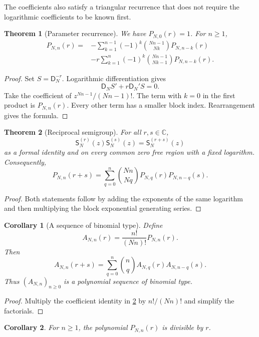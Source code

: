 \documentclass{aomart}
\newtheorem{theorem}{Theorem}[section]
\newtheorem{corollary}[corollary]{Corollary}
\theoremstyle{definition}
\theoremstyle{remark}
\newcommand{\CC}{\mathbb C}
\newcommand{\Dfun}{\mathsf D}
\newcommand{\Sfun}{\mathsf S}
\begin{document}
The coefficients also satisfy a triangular recurrence that does not require the logarithmic coefficients to be known first.

\begin{theorem}[Parameter recurrence]\label{thm:parameter_recurrence}
We have $P_{N,0}(r)=1$.  For $n\geq1$,
\[
\begin{aligned}
P_{N,n}(r)
={}&-
\sum_{k=1}^{n-1}
(-1)^k
\binom{Nn-1}{Nk}
P_{N,n-k}(r)
\\
&-r
\sum_{k=1}^{n}
(-1)^k
\binom{Nn-1}{Nk-1}
P_{N,n-k}(r).
\end{aligned}
\]
\end{theorem}

\begin{proof}
Set $S=\Dfun_N^{-r}$.  Logarithmic differentiation gives
\[
\Dfun_NS'+r\Dfun_N'S=0.
\]
Take the coefficient of $z^{Nn-1}/(Nn-1)!$.  The term with $k=0$ in the first product is $P_{N,n}(r)$.  Every other term has a smaller block index.  Rearrangement gives the formula.
\end{proof}

\begin{theorem}[Reciprocal semigroup]\label{thm:reciprocal_semigroup}
For all $r,s\in\CC$,
\[
\Sfun_N^{(r)}(z)\Sfun_N^{(s)}(z)
=
\Sfun_N^{(r+s)}(z)
\]
as a formal identity and on every common zero free region with a fixed logarithm.  Consequently,
\[
P_{N,n}(r+s)
=
\sum_{q=0}^{n}
\binom{Nn}{Nq}
P_{N,q}(r)P_{N,n-q}(s).
\]
\end{theorem}

\begin{proof}
Both statements follow by adding the exponents of the same logarithm and then multiplying the block exponential generating series.
\end{proof}

\begin{corollary}[A sequence of binomial type]\label{cor:binomial_type}
Define
\[
A_{N,n}(r)
=
\frac{n!}{(Nn)!}P_{N,n}(r).
\]
Then
\[
A_{N,n}(r+s)
=
\sum_{q=0}^{n}
\binom nq
A_{N,q}(r)A_{N,n-q}(s).
\]
Thus $(A_{N,n})_{n\geq0}$ is a polynomial sequence of binomial type.
\end{corollary}

\begin{proof}
Multiply the coefficient identity in \cref{thm:reciprocal_semigroup} by $n!/(Nn)!$ and simplify the factorials.
\end{proof}

\begin{corollary}\label{cor:factor_r}
For $n\geq1$, the polynomial $P_{N,n}(r)$ is divisible by $r$.
\end{corollary}
\end{document}
